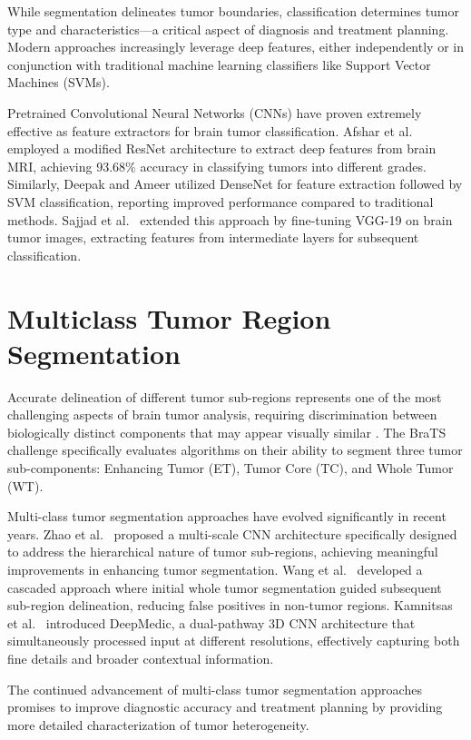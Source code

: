 While segmentation delineates tumor boundaries, classification determines tumor type and characteristics—a critical aspect of diagnosis and treatment planning. Modern approaches increasingly leverage deep features, either independently or in conjunction with traditional machine learning classifiers like Support Vector Machines (SVMs).

Pretrained Convolutional Neural Networks (CNNs) have proven extremely effective as feature extractors for brain tumor classification. Afshar et al.\ \cite{Afshar2019} employed a modified ResNet architecture to extract deep features from brain MRI, achieving 93.68\% accuracy in classifying tumors into different grades. Similarly, Deepak and Ameer \cite{Deepak2019} utilized DenseNet for feature extraction followed by SVM classification, reporting improved performance compared to traditional methods. Sajjad et al.\ \cite{Sajjad2019} extended this approach by fine-tuning VGG-19 on brain tumor images, extracting features from intermediate layers for subsequent classification.

\section{Multiclass Tumor Region Segmentation}

Accurate delineation of different tumor sub-regions represents one of the most challenging aspects of brain tumor analysis, requiring discrimination between biologically distinct components that may appear visually similar \cite{Bakas2018}. The BraTS challenge specifically evaluates algorithms on their ability to segment three tumor sub-components: Enhancing Tumor (ET), Tumor Core (TC), and Whole Tumor (WT).

Multi-class tumor segmentation approaches have evolved significantly in recent years. Zhao et al.\ \cite{Zhao2018} proposed a multi-scale CNN architecture specifically designed to address the hierarchical nature of tumor sub-regions, achieving meaningful improvements in enhancing tumor segmentation. Wang et al.\ \cite{Wang2017} developed a cascaded approach where initial whole tumor segmentation guided subsequent sub-region delineation, reducing false positives in non-tumor regions. Kamnitsas et al.\ \cite{Kamnitsas2017} introduced DeepMedic, a dual-pathway 3D CNN architecture that simultaneously processed input at different resolutions, effectively capturing both fine details and broader contextual information.

The continued advancement of multi-class tumor segmentation approaches promises to improve diagnostic accuracy and treatment planning by providing more detailed characterization of tumor heterogeneity.

